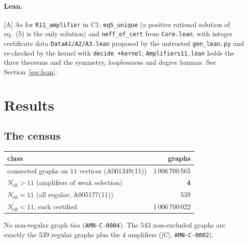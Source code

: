 \documentclass[10pt]{article}
\newcommand{\tier}[1]{\textsf{[#1]}}
\newcommand{\tA}{\tier{A}}
\newcommand{\tC}{\tier{C}}
\newcommand{\lean}[1]{\texttt{#1}}
\newcommand{\Neff}{N_{\mathrm{eff}}}
\begin{document}
\paragraph{Lean.}\tA{} As for \lean{R11\_amplifier} in C1: \lean{eq5\_unique} (a positive rational solution of eq.~(5) is the only solution) and \lean{neff\_of\_cert} from \texttt{Core.lean}, with integer certificate data \texttt{DataA1/A2/A3.lean} proposed by the untrusted \texttt{gen\_lean.py} and re-checked by the kernel with \lean{decide +kernel}; \lean{Amplifiers11.lean} holds the three theorems and the symmetry, looplessness and degree lemmas. See Section~\ref{sec:lean}.

\section{Results}\label{sec:results}
\subsection{The census}
\begin{center}\small\begin{tabular}{lr}\toprule
class & graphs\\\midrule
connected graphs on $11$ vertices (A001349(11)) & 1\,006\,700\,565\\
$\Neff>11$ (amplifiers of weak selection) & \textbf{4}\\
$\Neff=11$ (all regular; A005177(11)) & 539\\
$\Neff<11$, each certified & 1\,006\,700\,022\\\bottomrule
\end{tabular}\end{center}
No non-regular graph ties (\texttt{AMN-C-0004}). The $543$ non-excluded graphs are exactly the $539$ regular graphs plus the $4$ amplifiers (\tC, \texttt{AMN-C-0002}).
\end{document}
